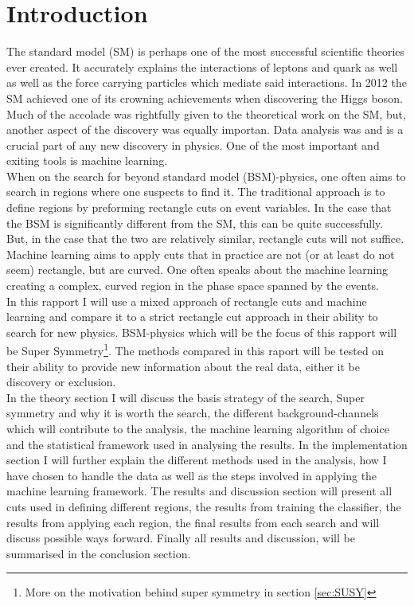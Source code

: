 \documentclass{article}
\begin{document}
\section{Introduction}
The standard model (SM) is perhaps one of the most successful scientific theories ever created. It accurately explains the interactions of leptons and quark as well as well as the force carrying particles which mediate said interactions. In 2012 the SM achieved one of its crowning achievements when discovering the Higgs boson. Much of the accolade was rightfully given to the theoretical work on the SM, but, another aspect of the discovery was equally importan. Data analysis was and is a crucial part of any new discovery in physics. One of the most important and exiting tools is machine learning.
\\
When on the search for beyond standard model (BSM)-physics, one often aims to search in regions where one suspects to find it. The traditional approach is to define regions by preforming rectangle cuts on event variables. In the case that the BSM is significantly different from the SM, this can be quite successfully. But, in the case that the two are relatively similar, rectangle cuts will not suffice. Machine learning aims to apply cuts that in practice are not (or at least do not seem) rectangle, but are curved. One often speaks about the machine learning creating a complex, curved region in the phase space spanned by the events.
\\
In this rapport I will use a mixed approach of rectangle cuts and machine learning and compare it to a strict rectangle cut approach in their ability to search for new physics. BSM-physics which will be the focus of this rapport will be Super Symmetry\footnote{More on the motivation behind super symmetry in section \ref{sec:SUSY}}. The methods compared in this raport will be tested on their ability to provide new information about the real data, either it be discovery or exclusion.
\\
In the theory section I will discuss the basis strategy of the search, Super symmetry and why it is worth the search, the different background-channels which will contribute to the analysis, the machine learning algorithm of choice and the statistical framework used in analysing the results. In the implementation section I will further explain the different methods used in the analysis, how I have chosen to handle the data as well as the steps involved in applying the machine learning framework. The results and discussion section will present all cuts used in defining different regions, the results from training the classifier, the results from applying each region, the final results from each search and will discuss possible ways forward. Finally all results and discussion, will be summarised in the conclusion section.
\end{document}
